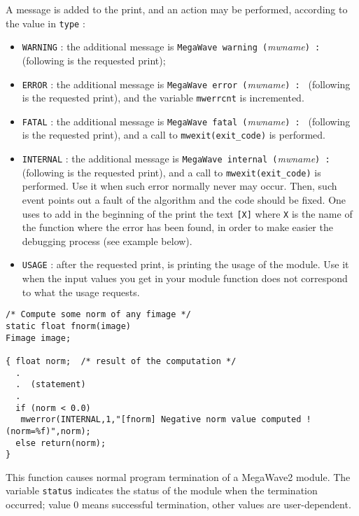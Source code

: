 A message is added to the print, and an action may be performed, according to the value in \verb+type+ :
\begin{itemize}
\item \verb+WARNING+ :
the additional message is \verb+MegaWave warning (+{\em mwname}\verb+) : + (following is the requested print);

\item \verb+ERROR+ :
the additional message is \verb+MegaWave error (+{\em mwname}\verb+) : +  (following is the requested print), and
the variable \verb+mwerrcnt+ is incremented.

\item \verb+FATAL+ :
the additional message is \verb+MegaWave fatal (+{\em mwname}\verb+) : +  (following is the requested print), and a call to \verb+mwexit(exit_code)+ is performed.

\item \verb+INTERNAL+ :
the additional message is \verb+MegaWave internal (+{\em mwname}\verb+) : + (following is the requested print), and a call to \verb+mwexit(exit_code)+ is performed.
Use it when such error normally never may occur. 
Then, such event points out a fault of the algorithm and the code should be fixed.
One uses to add in the beginning of the print the text \verb+[X]+ where \verb+X+ is the name of the function where the error has been found, in order to make easier the debugging process (see example below).

\item \verb+USAGE+ : 
after the requested print, is printing the usage of the module.
Use it when the input values you get in your module function does not correspond to what the usage requests.
\end{itemize}


\Next
\Example
\begin{verbatim}
/* Compute some norm of any fimage */
static float fnorm(image) 
Fimage image; 

{ float norm;  /* result of the computation */
  .
  .  (statement)
  .
  if (norm < 0.0)
   mwerror(INTERNAL,1,"[fnorm] Negative norm value computed ! (norm=%f)",norm);
  else return(norm);
}
\end{verbatim}

\newpage %

\Description
This function causes normal program termination of a MegaWave2 module.
The variable \verb+status+ indicates the status of the module when the
termination occurred; value $0$ means successful termination, other values are user-dependent.

